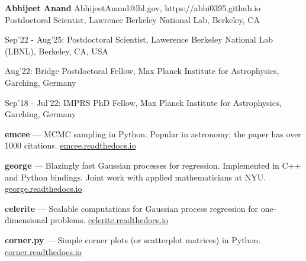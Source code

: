 \documentclass[12pt,letterpaper]{article}
\begin{document}
\thispagestyle{empty}\sloppy\sloppypar\raggedbottom

\textbf{\Large Abhijeet Anand} \hfill
\textsf{\small AbhijeetAnand@lbl.gov, https://abhi0395.github.io} \\[0.5ex]
Postdoctoral Scientist, Lawrence Berkeley National Lab, Berkeley, CA\\[0.5ex]

\begin{list}{}{\cvlist}
\item
Sep'22 - Aug'25: Postdoctoral Scientist, Lawerence Berkeley National Lab (LBNL), Berkeley, CA, USA
\item
Aug'22: Bridge Postdoctoral Fellow, Max Planck Institute for Astrophysics, Garching, Germany
\item
Sep'18 - Jul'22: IMPRS PhD Fellow, Max Planck Institute for Astrophysics, Garching, Germany
\end{list}


\begin{list}{}{\cvlist}

\end{list}

\begin{list}{}{\cvlist}

\item {\bf emcee} ---
    MCMC sampling in Python. Popular in astronomy;
    the paper has over 1000 citations.
    \url{emcee.readthedocs.io}

\item {\bf george} ---
    Blazingly fast Gaussian processes for regression. Implemented in C++ and
    Python bindings. Joint work with applied mathematicians at NYU.
    \url{george.readthedocs.io}

\item {\bf celerite} ---
    Scalable computations for Gaussian process regression for one-dimensional
    problems.
    \url{celerite.readthedocs.io}

\item {\bf corner.py} ---
    Simple corner plots (or scatterplot matrices) in Python.
    \url{corner.readthedocs.io}

\end{list}
\end{document}

